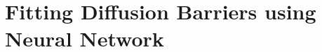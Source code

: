 \section{Fitting Diffusion Barriers using Neural Network}
\label{Chap:Al/Vac:section:NN}

\newpage
\begingroup
\begin{figure}[!ht]
  \centering
\caption[]{}
\label{Chap:Al/Vac:fig:fitting_all}
\end{figure}
\endgroup
